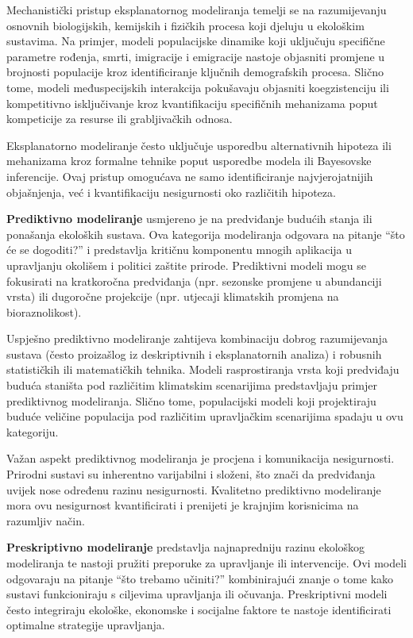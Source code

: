 \documentclass[11pt,oneside]{book}
\begin{document}
Mechanistički pristup eksplanatornog modeliranja temelji se na razumijevanju osnovnih biologijskih, kemijskih i fizičkih procesa koji djeluju u ekološkim sustavima. Na primjer, modeli populacijske dinamike koji uključuju specifične parametre rođenja, smrti, imigracije i emigracije nastoje objasniti promjene u brojnosti populacije kroz identificiranje ključnih demografskih procesa. Slično tome, modeli međuspecijskih interakcija pokušavaju objasniti koegzistenciju ili kompetitivno isključivanje kroz kvantifikaciju specifičnih mehanizama poput kompeticije za resurse ili grabljivačkih odnosa.

Eksplanatorno modeliranje često uključuje usporedbu alternativnih hipoteza ili mehanizama kroz formalne tehnike poput usporedbe modela ili Bayesovske inferencije. Ovaj pristup omogućava ne samo identificiranje najvjerojatnijih objašnjenja, već i kvantifikaciju nesigurnosti oko različitih hipoteza.

\textbf{Prediktivno modeliranje} usmjereno je na predviđanje budućih stanja ili ponašanja ekoloških sustava. Ova kategorija modeliranja odgovara na pitanje ``što će se dogoditi?'' i predstavlja kritičnu komponentu mnogih aplikacija u upravljanju okolišem i politici zaštite prirode. Prediktivni modeli mogu se fokusirati na kratkoročna predviđanja (npr. sezonske promjene u abundanciji vrsta) ili dugoročne projekcije (npr. utjecaji klimatskih promjena na bioraznolikost).

Uspješno prediktivno modeliranje zahtijeva kombinaciju dobrog razumijevanja sustava (često proizašlog iz deskriptivnih i eksplanatornih analiza) i robusnih statističkih ili matematičkih tehnika. Modeli rasprostiranja vrsta koji predviđaju buduća staništa pod različitim klimatskim scenarijima predstavljaju primjer prediktivnog modeliranja. Slično tome, populacijski modeli koji projektiraju buduće veličine populacija pod različitim upravljačkim scenarijima spadaju u ovu kategoriju.

Važan aspekt prediktivnog modeliranja je procjena i komunikacija nesigurnosti. Prirodni sustavi su inherentno varijabilni i složeni, što znači da predviđanja uvijek nose određenu razinu nesigurnosti. Kvalitetno prediktivno modeliranje mora ovu nesigurnost kvantificirati i prenijeti je krajnjim korisnicima na razumljiv način.

\textbf{Preskriptivno modeliranje} predstavlja najnapredniju razinu ekološkog modeliranja te nastoji pružiti preporuke za upravljanje ili intervencije. Ovi modeli odgovaraju na pitanje ``što trebamo učiniti?'' kombinirajući znanje o tome kako sustavi funkcioniraju s ciljevima upravljanja ili očuvanja. Preskriptivni modeli često integriraju ekološke, ekonomske i socijalne faktore te nastoje identificirati optimalne strategije upravljanja.
\end{document}
